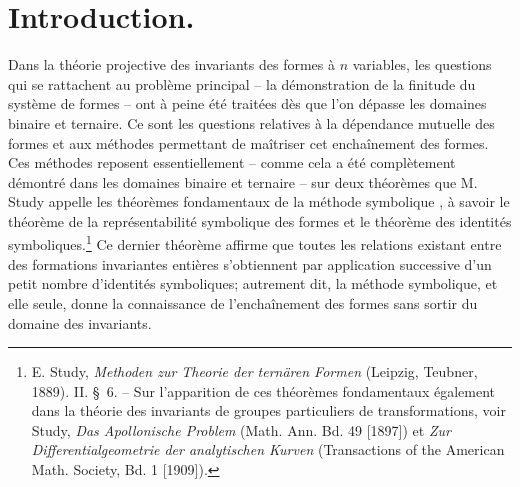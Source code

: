 \documentclass[11pt]{article}
\begin{document}
\section*{Introduction.}
Dans la théorie projective des invariants des formes à $n$ variables, les questions qui se rattachent au problème principal -- la démonstration de la finitude du système de formes -- ont à peine été traitées dès que l'on dépasse les domaines binaire et ternaire. Ce sont les questions relatives à la dépendance mutuelle des formes et aux méthodes permettant de maîtriser cet enchaînement des formes. Ces méthodes reposent essentiellement -- comme cela a été complètement démontré dans les domaines binaire et ternaire -- sur deux théorèmes que M. Study appelle les \og théorèmes fondamentaux de la méthode symbolique \fg{}, à savoir le théorème de la représentabilité symbolique des formes et le théorème des identités symboliques.\footnote{E. Study, \emph{Methoden zur Theorie der ternären Formen} (Leipzig, Teubner, 1889). II. \S\ 6. -- Sur l'apparition de ces théorèmes fondamentaux également dans la théorie des invariants de groupes particuliers de transformations, voir Study, \emph{Das Apollonische Problem} (Math. Ann. Bd. 49 [1897]) et \emph{Zur Differentialgeometrie der analytischen Kurven} (Transactions of the American Math. Society, Bd. 1 [1909]).} Ce dernier théorème affirme que toutes les relations existant entre des formations invariantes entières s'obtiennent par application successive d'un petit nombre d'identités symboliques; autrement dit, la méthode symbolique, et elle seule, donne la connaissance de l'enchaînement des formes sans sortir du domaine des invariants.
\end{document}
